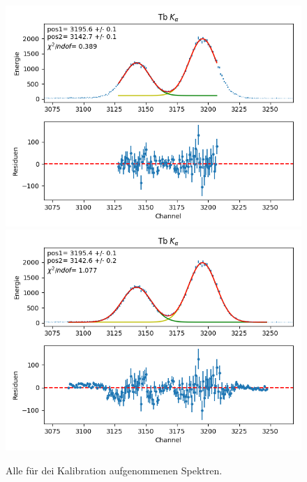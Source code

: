 \documentclass[12pt,a4paper]{article}
\begin{document}
\begin{figure}[H]
\centering
\includegraphics[scale=0.8]{Bilder/alpha/tb_alpha_1.png}
\includegraphics[scale=0.8]{Bilder/alpha/tb_alpha_2.png}
\caption{Alle für dei Kalibration aufgenommenen Spektren.}
\label{fig:kal_alles}
\end{figure}
\end{document}
